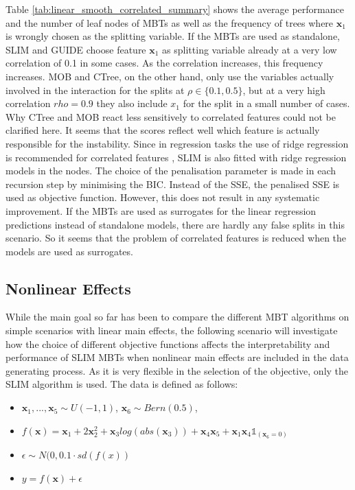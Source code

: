 Table \ref{tab:linear_smooth_correlated_summary} shows the average performance and the number of leaf nodes of MBTs  as well as the frequency of trees where $\textbf{x}_1$ is wrongly chosen as the splitting variable.
If the MBTs are used as standalone, SLIM and GUIDE choose feature $\textbf{x}_1$ as splitting variable already at a very low correlation of 0.1 in some cases. As the correlation increases, this frequency increases. MOB and CTree, on the other hand, only use the variables actually involved in the interaction for the splits at $\rho \in \{0.1, 0.5\}$, but at a very high correlation $rho = 0.9$ they also include $x_1$ for the split in a small number of cases. Why CTree and MOB react less sensitively to correlated features could not be clarified here. It seems that the scores reflect well which feature is actually responsible for the instability.
Since in regression tasks the use of ridge regression is recommended for correlated features \citep{McDonald.2009}, SLIM is also fitted with ridge regression models in the nodes. The choice of the penalisation parameter is made in each recursion step by minimising the BIC. Instead of the SSE, the penalised SSE is used as objective function. However, this does not result in any systematic improvement. 
If the MBTs are used as surrogates for the linear regression predictions instead of standalone models, there are hardly any false splits in this scenario. So it seems that the problem of correlated features is reduced when the models are used as surrogates.





\subsection{Nonlinear Effects}
While the main goal so far has been to compare the different MBT algorithms on simple scenarios with linear main effects, the following scenario will investigate how the choice of different objective functions affects the interpretability and performance of SLIM MBTs when nonlinear main effects are included in the data generating process. 
As it is very flexible in the selection of the objective, only the SLIM algorithm is used. The data is defined as follows:

\begin{itemize}
    \item $\textbf{x}_1, ..., \textbf{x}_5 \sim U(-1,1)$, $\textbf{x}_6 \sim Bern(0.5)$, 
    \item $ f(\textbf{x}) = \textbf{x}_1 + 2 \textbf{x}_2^2 + \textbf{x}_3log(abs(\textbf{x}_3)) + \textbf{x}_4\textbf{x}_5 + \textbf{x}_1\textbf{x}_4\mathbb{1}_{(\textbf{x}_6 = 0)}$
    \item $\epsilon \sim N(0,  0.1 \cdot sd(f(x))$
    \item $y = f(\textbf{x}) + \epsilon$     
\end{itemize}

